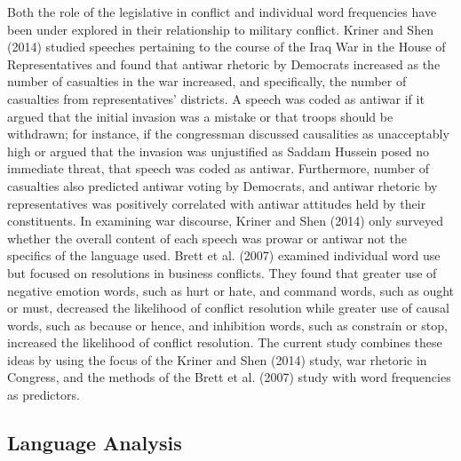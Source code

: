 \documentclass[english,man]{apa6}
\theoremstyle{definition}
\theoremstyle{definition}
\theoremstyle{definition}
\theoremstyle{remark}
\begin{document}
Both the role of the legislative in conflict and individual word
frequencies have been under explored in their relationship to military
conflict. Kriner and Shen (2014) studied speeches pertaining to the
course of the Iraq War in the House of Representatives and found that
antiwar rhetoric by Democrats increased as the number of casualties in
the war increased, and specifically, the number of casualties from
representatives' districts. A speech was coded as antiwar if it argued
that the initial invasion was a mistake or that troops should be
withdrawn; for instance, if the congressman discussed causalities as
unacceptably high or argued that the invasion was unjustified as Saddam
Hussein posed no immediate threat, that speech was coded as antiwar.
Furthermore, number of casualties also predicted antiwar voting by
Democrats, and antiwar rhetoric by representatives was positively
correlated with antiwar attitudes held by their constituents. In
examining war discourse, Kriner and Shen (2014) only surveyed whether
the overall content of each speech was prowar or antiwar not the
specifics of the language used. Brett et al. (2007) examined individual
word use but focused on resolutions in business conflicts. They found
that greater use of negative emotion words, such as hurt or hate, and
command words, such as ought or must, decreased the likelihood of
conflict resolution while greater use of causal words, such as because
or hence, and inhibition words, such as constrain or stop, increased the
likelihood of conflict resolution. The current study combines these
ideas by using the focus of the Kriner and Shen (2014) study, war
rhetoric in Congress, and the methods of the Brett et al. (2007) study
with word frequencies as predictors.

\subsection{Language Analysis}\label{language-analysis}
\end{document}
